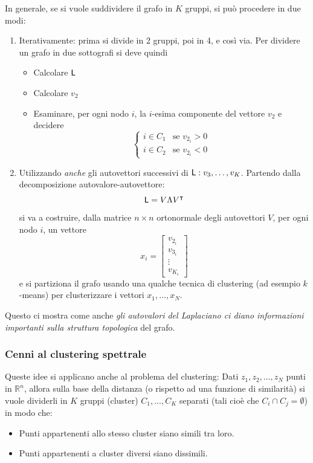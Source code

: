 In generale, se si vuole suddividere il grafo in $K$ gruppi, si pu\`o procedere in due modi:
\begin{enumerate}
    \item Iterativamente: prima si divide in 2 gruppi, poi in 4, e cos\`i via. Per dividere un grafo in due sottografi si deve quindi
    \begin{itemize}
        \item Calcolare $\mathsf{L}$
        \item Calcolare $v_2$
        \item Esaminare, per ogni nodo $i$, la $i$-esima componente del vettore $v_2$ e decidere
        \begin{equation}
            \begin{cases}
                i \in C_1 &\text{se } v_{2_i} > 0 \\
                i \in C_2 &\text{se } v_{2_i} < 0
            \end{cases}
        \end{equation}
    \end{itemize}
    \item Utilizzando \textit{anche} gli autovettori successivi di $\mathsf{L}: v_3, \dots, v_K$. Partendo dalla decomposizione autovalore-autovettore:
    \[
    \mathsf{L} = V \Lambda V^\intercal
    \]
    si va a costruire, dalla matrice $n\times n$ ortonormale degli autovettori $V$, per ogni nodo $i$, un vettore
    \[
    x_i = \begin{bmatrix}
    v_{2_i} \\
    v_{3_i} \\
    \vdots \\
    v_{K_i}
    \end{bmatrix}
    \]
    e si partiziona il grafo usando una qualche tecnica di clustering (ad esempio $k$-means) per clusterizzare i vettori $x_1, \dots, x_N$.
\end{enumerate}

Questo ci mostra come anche \textit{gli autovalori del Laplaciano ci diano informazioni importanti sulla struttura topologica} del grafo.

\subsubsection{Cenni al clustering spettrale}

Queste idee si applicano anche al problema del clustering: 
Dati $z_1, z_2, \dots, z_N$ punti in $\mathbb{R}^n$, allora sulla base della distanza (o rispetto ad una funzione di similarit\`a) si vuole dividerli in $K$ gruppi (cluster) $C_1, \dots, C_K$ separati (tali cio\`e che $C_i \cap C_j = \emptyset$) in modo che:
\begin{itemize}
\item Punti appartenenti allo stesso cluster siano simili tra loro.
\item Punti appartenenti a cluster diversi siano dissimili.
\end{itemize}

